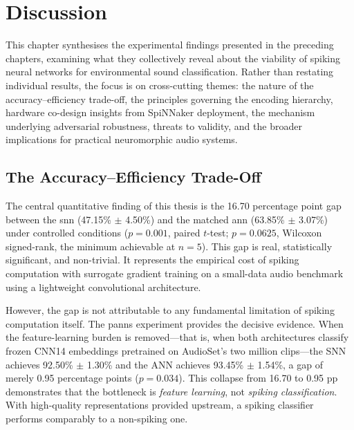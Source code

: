 
\chapter{Discussion}
\label{ch:discussion}

This chapter synthesises the experimental findings presented in the preceding chapters, examining what they collectively reveal about the viability of spiking neural networks for environmental sound classification. Rather than restating individual results, the focus is on cross-cutting themes: the nature of the accuracy--efficiency trade-off, the principles governing the encoding hierarchy, hardware co-design insights from SpiNNaker deployment, the mechanism underlying adversarial robustness, threats to validity, and the broader implications for practical neuromorphic audio systems.

\section{The Accuracy--Efficiency Trade-Off}
\label{sec:accuracy-efficiency}

The central quantitative finding of this thesis is the 16.70 percentage point gap between the \gls{snn} (47.15\% $\pm$ 4.50\%) and the matched \gls{ann} (63.85\% $\pm$ 3.07\%) under controlled conditions ($p = 0.001$, paired $t$-test; $p = 0.0625$, Wilcoxon signed-rank, the minimum achievable at $n = 5$). This gap is real, statistically significant, and non-trivial. It represents the empirical cost of spiking computation with surrogate gradient training on a small-data audio benchmark using a lightweight convolutional architecture.

However, the gap is not attributable to any fundamental limitation of spiking computation itself. The \gls{panns} experiment provides the decisive evidence. When the feature-learning burden is removed---that is, when both architectures classify frozen CNN14 embeddings pretrained on AudioSet's two million clips---the SNN achieves 92.50\% $\pm$ 1.30\% and the ANN achieves 93.45\% $\pm$ 1.54\%, a gap of merely 0.95 percentage points ($p = 0.034$). This collapse from 16.70 to 0.95 pp demonstrates that the bottleneck is \emph{feature learning}, not \emph{spiking classification}. With high-quality representations provided upstream, a spiking classifier performs comparably to a non-spiking one.

